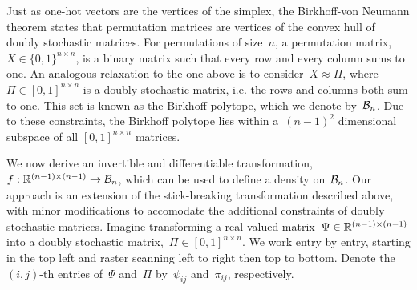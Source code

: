 \documentclass{article}
\begin{document}
Just as one-hot vectors are the vertices of the simplex, the Birkhoff-von Neumann
theorem states that permutation matrices are vertices of the convex
hull of doubly stochastic matrices.
For permutations of size~$n$, a permutation matrix,~$X \in \{0,1\}^{n \times n}$,
is a binary matrix such that every row and every column sums to one.
An analogous relaxation to the one above is to consider~$X \approx {\Pi}$,
where~${\Pi} \in [0,1]^{n \times n}$ is a doubly stochastic matrix,
i.e. the rows and columns both sum to one. This set is known as the Birkhoff
polytope, which we denote by~$\mathcal{B}_n$. Due to these constraints, the Birkhoff
polytope lies within a~$(n-1)^2$ dimensional subspace of all $[0,1]^{n \times n}$ matrices. 

We now derive an invertible and differentiable transformation,~$f: \mathbb{R}^{(n-1) \times (n-1)} \to \mathcal{B}_n$,
which can be used to define a density on~$\mathcal{B}_n$. Our approach is an
extension of the stick-breaking transformation described above, with minor
modifications to accomodate the additional constraints of doubly stochastic
matrices. Imagine transforming a real-valued matrix~$\Psi \in \mathbb{R}^{(n-1) \times (n-1)}$
into a doubly stochastic matrix,~${\Pi} \in [0,1]^{n \times n}$.
We work entry by entry, starting in the top left
and raster scanning left to right then top to bottom. Denote the~$(i,j)$-th entries
of~$\Psi$ and~${\Pi}$ by~$\psi_{ij}$ and~${\pi}_{ij}$, respectively.
\end{document}
